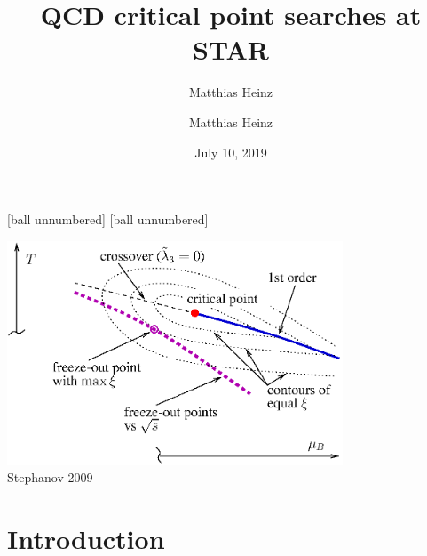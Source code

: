 \documentclass[accentcolor=tud2c,usenames,dvipsnames,colorbacktitle,inverttitle,landscape,german,presentation,t]{tudbeamer}
\begin{document}

  \title{QCD critical point searches at STAR}
  \subtitle{\small{Matthias Heinz}}
  \author{Matthias Heinz}
  \date{July 10, 2019}

  [ball unnumbered]
  [ball unnumbered]

  \nocite{*}

  \begin{titleframe}
    \begin{center}
      \includegraphics[width=0.75\textwidth]{figures/05/critical_point_illustration}
      \\\footnotesize{Stephanov 2009}
    \end{center}
  \end{titleframe}

  \section{Introduction}
\end{document}
